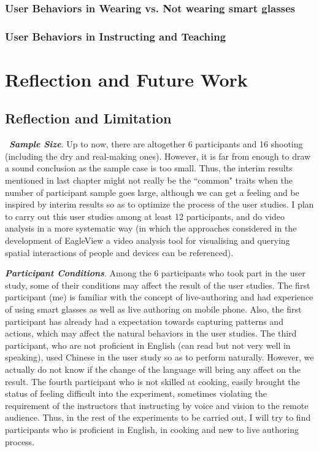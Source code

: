 \documentclass[fyp]{socreport}
\begin{document}
\subsection{User Behaviors in Wearing vs. Not wearing smart glasses}
\subsection{User Behaviors in Instructing and Teaching}

\chapter{Reflection and Future Work}
\section{Reflection and Limitation}
\quad\, \textit{\textbf{Sample Size}}. Up to now, there are altogether 6 participants and 16 shooting (including the dry and real-making ones). However, it is far from enough to draw a sound conclusion as the sample case is too small. Thus, the interim results mentioned in last chapter might not really be the ``common" traits when the number of participant sample goes large, although we can get a feeling and be inspired by interim results so as to optimize the process of the user studies. I plan to carry out this user studies among at least 12 participants, and do video analysis in a more systematic way (in which the approaches considered in the development of EagleView \cite{brudy2018eagleview} a video analysis tool for visualising and querying spatial interactions of people and devices can be referenced).

\textit{\textbf{Participant Conditions}}. Among the 6 participants who took part in the user study, some of their conditions may affect the result of the user studies. The first participant (me) is familiar with the concept of live-authoring and had experience of using smart glasses as well as live authoring on mobile phone. Also, the first participant has already had a expectation towards capturing patterns and actions, which may affect the natural behaviors in the user studies. The third participant, who are not proficient in English (can read but not very well in speaking), used Chinese in the user study so as to perform naturally. However, we actually do not know if the change of the language will bring any affect on the result. The fourth participant who is not skilled at cooking, easily brought the status of feeling difficult into the experiment, sometimes violating the requirement of the instructors that instructing by voice and vision to the remote audience. Thus, in the rest of the experiments to be carried out, I will try to find participants who is proficient in English, in cooking and new to live authoring process.
\end{document}
